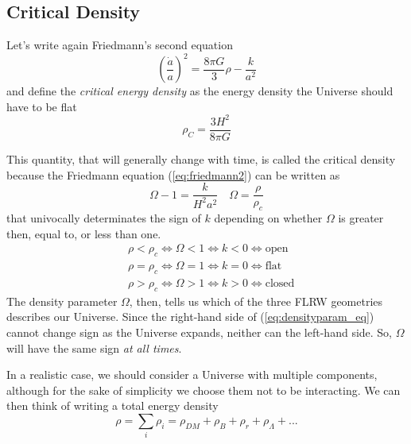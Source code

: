 \subsection{Critical Density}

Let's write again Friedmann's second equation
\begin{equation}
    \left(\frac{\dot{a}}{a}\right)^{2} = \frac{8\pi G}{3}\rho -\frac{k}{a^{2}}
\end{equation}
and define the \emph{critical energy density} as the energy density the Universe should have to be flat 
\begin{equation}
    \rho_{C} = \frac{3H^{2}}{8\pi G}
    \label{eq:criticaldensity}
\end{equation}
\par This quantity, that will generally change with time, is called the critical density because the Friedmann equation (\ref{eq:friedmann2}) can be written as
\begin{equation}
    \Omega - 1 = \frac{k}{H^{2}a^{2}} \quad \Omega = \frac{\rho}{\rho_{c}}
    \label{eq:densityparam_eq}
\end{equation}
that univocally determinates the sign of $k$ depending on whether $\Omega$ is greater then, equal to, or less than one.
\begin{align*}
    & \rho < \rho_{c} \iff \Omega < 1 \iff k < 0 \iff \text{open} \\
    & \rho = \rho_{c} \iff \Omega = 1 \iff k = 0 \iff \text{flat} \\
    & \rho > \rho_{c} \iff \Omega > 1 \iff k > 0 \iff \text{closed} 
\end{align*}
The density parameter $\Omega$, then, tells us which of the three FLRW geometries describes our Universe. Since the right-hand side of (\ref{eq:densityparam_eq}) cannot change sign as the Universe expands, neither can the left-hand side. So, $\Omega$ will have the same sign \emph{at all times}.
\par In a realistic case, we should consider a Universe with multiple components, although for the sake of simplicity we choose them not to be interacting. We can then think of writing a total energy density
\begin{equation}
    \rho = \sum_{i}\rho_{i} = \rho_{DM} + \rho_{B} + \rho_{r} + \rho_{\Lambda} + ... 
    \label{eq:totaldensity}
\end{equation}
